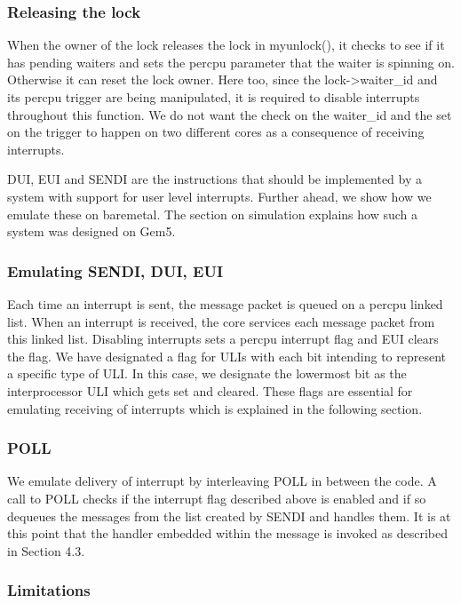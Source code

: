\subsubsection{Releasing the lock}

When the owner of the lock releases the lock in myunlock(), it checks to see if
it has pending waiters and sets the percpu parameter that the waiter is spinning
on. Otherwise it can reset the lock owner. Here too, since the lock->waiter\_id
and its percpu trigger are being manipulated, it is required to disable
interrupts throughout this function. We do not want the check on the waiter\_id
and the set on the trigger to happen on two different cores as a consequence of
receiving interrupts.

DUI, EUI and SENDI are the instructions that should be implemented by a system
with support for user level interrupts. Further ahead, we show how we emulate
these on baremetal. The section on simulation explains how such a system was
designed on Gem5.

\subsubsection{Emulating SENDI, DUI, EUI}

Each time an interrupt is sent, the message packet is queued on a percpu linked
list. When an interrupt is received, the core services each message packet from
this linked list. Disabling interrupts sets a percpu interrupt flag and EUI clears
the flag. We have designated a flag for ULIs with each bit intending to represent
a specific type of ULI.  In this case, we designate the lowermost bit as the
interprocessor ULI which gets set and cleared. These flags are essential for
emulating receiving of interrupts which is explained in the following section.

\subsubsection{POLL}

We emulate delivery of interrupt by interleaving POLL in between the code. A
call to POLL checks if the interrupt flag described above is enabled and if so
dequeues the messages from the list created by SENDI and handles them.  It is at
this point that the handler embedded within the message is invoked as described
in Section 4.3.

\subsubsection{Limitations}

